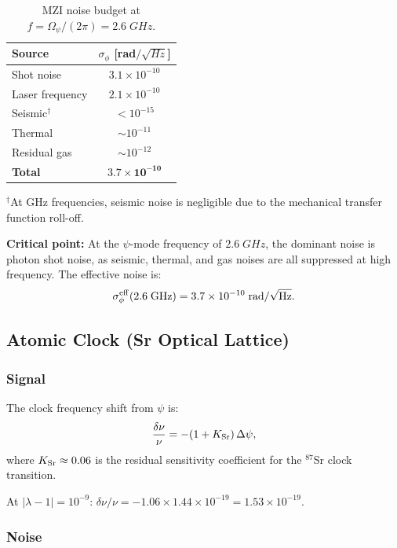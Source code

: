 \documentclass[aps,prd,twocolumn,superscriptaddress,nofootinbib]{revtex4-2}
\newcommand{\ee}[1]{\times 10^{#1}}
\begin{document}
\begin{table}[h]
\centering
\caption{MZI noise budget at $f = \Omega_\psi/(2\pi) = 2.6\;\si{GHz}$.}
\label{tab:mzi-noise}
\begin{ruledtabular}
\begin{tabular}{lc}
Source & $\sigma_\phi$ [rad$/\sqrt{\si{Hz}}$] \\
\hline
Shot noise & $3.1\ee{-10}$ \\
Laser frequency & $2.1\ee{-10}$ \\
Seismic$^\dagger$ & $< 10^{-15}$ \\
Thermal & $\sim 10^{-11}$ \\
Residual gas & $\sim 10^{-12}$ \\
\hline
\textbf{Total} & $\mathbf{3.7\ee{-10}}$ \\
\end{tabular}
\end{ruledtabular}
{\footnotesize $^\dagger$At GHz frequencies, seismic noise is negligible
due to the mechanical transfer function roll-off.}
\end{table}

\textbf{Critical point:} At the $\psi$-mode frequency of
$2.6\;\si{GHz}$, the dominant noise is photon shot noise,
as seismic, thermal, and gas noises are all suppressed at
high frequency.  The effective noise is:
\begin{equation}
\sigma_\phi^{\rm eff}(2.6\;\si{GHz}) = 3.7\ee{-10}\;\si{rad/\sqrt{Hz}}.
\end{equation}

\subsection{Atomic Clock (Sr Optical Lattice)}

\subsubsection{Signal}

The clock frequency shift from $\psi$ is:
\begin{equation}
\frac{\delta\nu}{\nu} = -(1 + K_{\rm Sr})\,\Delta\psi,
\end{equation}
where $K_{\rm Sr} \approx 0.06$ is the residual sensitivity
coefficient for the $^{87}$Sr clock transition.

At $|\lambda-1| = 10^{-9}$:
$\delta\nu/\nu = -1.06 \times 1.44\ee{-19} = 1.53\ee{-19}$.

\subsubsection{Noise}
\end{document}
